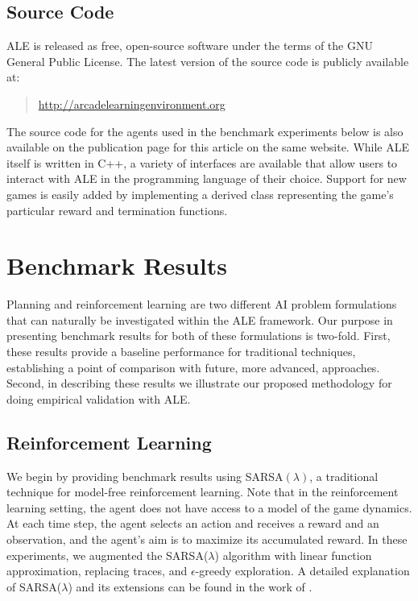 \documentclass[twoside,11pt]{article}
\begin{document}
\subsection{Source Code}
ALE is released as free, open-source software under the terms of the GNU General Public License.
The latest version of the source code is publicly available at:
\begin{quote} 
\url{http://arcadelearningenvironment.org}
\end{quote}
The source code for the agents used in the benchmark experiments below is also available on the publication page for this article on the same website. While ALE itself is written in C++, a variety of interfaces are available that allow users to interact with ALE in the programming language of their choice. Support for new games is easily added by implementing a derived class representing the game's particular reward and termination functions. 

\section{Benchmark Results}
Planning and reinforcement learning are two different AI problem formulations that can naturally be investigated within the ALE framework. Our purpose in presenting benchmark results for both of these formulations is two-fold.  First, these results provide a baseline performance for traditional techniques, establishing a point of comparison with future, more advanced, approaches.  Second, in describing these results we illustrate our proposed methodology for doing empirical validation with ALE.

\subsection{Reinforcement Learning}
\label{sec:RL}

We begin by providing benchmark results using SARSA$(\lambda)$, a traditional technique for model-free reinforcement learning.
Note that in the reinforcement learning setting, the agent does not have access to a model of the game dynamics.
At each time step, the agent selects an action and receives a reward and an observation, and the agent's aim is to maximize its accumulated reward. 
In these experiments, we augmented the SARSA($\lambda$) algorithm with linear function approximation, replacing traces, and $\epsilon$-greedy exploration. 
A detailed explanation of SARSA($\lambda$) and its extensions can be found in the work of . 
\end{document}
